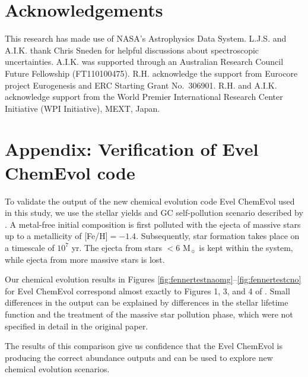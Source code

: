 \section{Acknowledgements}
This research has made use of NASA's Astrophysics Data System. L.J.S. and A.I.K. thank Chris Sneden for helpful discussions about spectroscopic uncertainties. A.I.K. was supported through an Australian Research Council Future Fellowship (FT110100475). R.H. acknowledge the support from Eurocore project Eurogenesis and ERC Starting Grant No.~306901. R.H. and A.I.K. acknowledge support from the World Premier International Research Center Initiative (WPI Initiative), MEXT, Japan.

\section{Appendix: Verification of Evel ChemEvol code}\label{appendix:code}
To validate the output of the new chemical evolution code Evel ChemEvol used in this study, we use the stellar yields and GC self-pollution scenario described by \citet{Fenner:2004ju}. A metal-free initial composition is first polluted with the ejecta of massive stars up to a metallicity of [Fe/H]$=-1.4$. Subsequently, star formation takes place on a timescale of $10^7$ yr. The ejecta from stars $< 6$ M$_\sun$ is kept within the system, while ejecta from more massive stars is lost.

Our chemical evolution results in Figures \ref{fig:fennertestnaomg}--\ref{fig:fennertestcno} for Evel ChemEvol correspond almost exactly to Figures 1, 3, and 4 of \citet{Fenner:2004ju}. Small differences in the output can be explained by differences in the stellar lifetime function and the treatment of the massive star pollution phase, which were not specified in detail in the original paper.

The results of this comparison give us confidence that the Evel ChemEvol is producing the correct abundance outputs and can be used to explore new chemical evolution scenarios.

